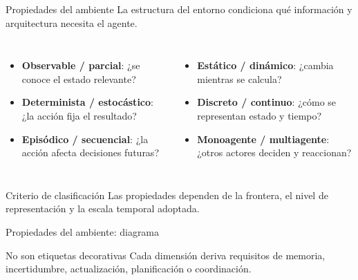 \documentclass[aspectratio=169,11pt]{beamer}
\newcommand{\concepto}[1]{\textcolor{UAPTeal}{\textbf{#1}}}
\begin{document}
\begin{frame}{Propiedades del ambiente}
  La estructura del entorno condiciona qué información y arquitectura necesita el agente.
  \begin{columns}[T]
      \begin{itemize}
        \item \concepto{Observable / parcial}: ¿se conoce el estado relevante?
        \item \concepto{Determinista / estocástico}: ¿la acción fija el resultado?
        \item \concepto{Episódico / secuencial}: ¿la acción afecta decisiones futuras?
      \end{itemize}
      \begin{itemize}
        \item \concepto{Estático / dinámico}: ¿cambia mientras se calcula?
        \item \concepto{Discreto / continuo}: ¿cómo se representan estado y tiempo?
        \item \concepto{Monoagente / multiagente}: ¿otros actores deciden y reaccionan?
      \end{itemize}
  \end{columns}
  \vfill
  \begin{block}{Criterio de clasificación}
    Las propiedades dependen de la frontera, el nivel de representación y la escala temporal adoptada.
  \end{block}
\end{frame}

\begin{frame}{Propiedades del ambiente: diagrama}
  \centering
  \vfill
  \begin{block}{No son etiquetas decorativas}
    Cada dimensión deriva requisitos de memoria, incertidumbre, actualización, planificación o coordinación.
  \end{block}
\end{frame}
\end{document}
